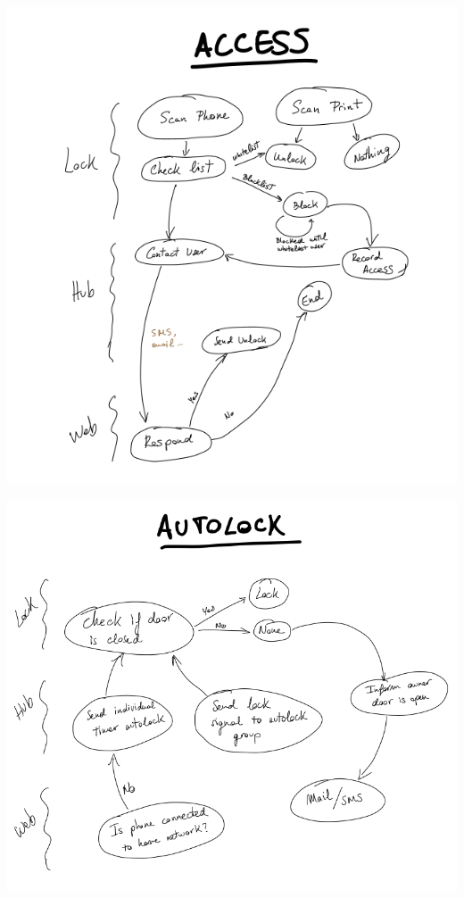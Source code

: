 \documentclass{article}
\begin{document}
\includegraphics[scale=0.4]{access_graph.png}

\includegraphics[scale=0.4]{autolock_graph.png}
\end{document}
